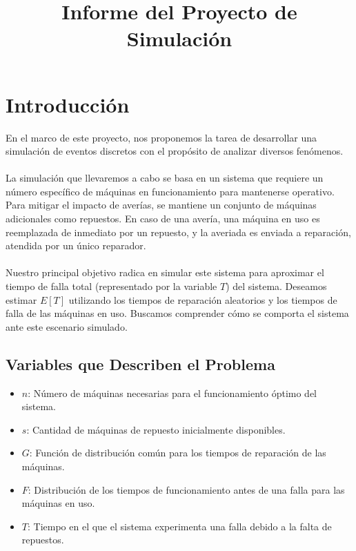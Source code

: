 \documentclass{article}
\begin{document}
\title{Informe del Proyecto de Simulación}
\maketitle


\section{Introducción}

 En el marco de este proyecto, nos proponemos la tarea de desarrollar una simulación de eventos discretos con el propósito de analizar diversos fenómenos.
\\\\
 La simulación que llevaremos a cabo se basa en un sistema que requiere un número específico de máquinas en funcionamiento para mantenerse operativo. Para mitigar el impacto de averías, se mantiene un conjunto de máquinas adicionales como repuestos. En caso de una avería, una máquina en uso es reemplazada de inmediato por un repuesto, y la averiada es enviada a reparación, atendida por un único reparador.
\\\\
 Nuestro principal objetivo radica en simular este sistema para aproximar el tiempo de falla total (representado por la variable \(T\)) del sistema. Deseamos estimar \(E[T]\) utilizando los tiempos de reparación aleatorios y los tiempos de falla de las máquinas en uso. Buscamos comprender cómo se comporta el sistema ante este escenario simulado.

\subsection{Variables que Describen el Problema}
\begin{itemize}
  \item \(\textit{n}\): Número de máquinas necesarias para el funcionamiento óptimo del sistema.
  \item \(\textit{s}\): Cantidad de máquinas de repuesto inicialmente disponibles.
  \item \(\textit{G}\): Función de distribución común para los tiempos de reparación de las máquinas.
  \item \(\textit{F}\): Distribución de los tiempos de funcionamiento antes de una falla para las máquinas en uso.
  \item \(\textit{T}\): Tiempo en el que el sistema experimenta una falla debido a la falta de repuestos.
\end{itemize}
\end{document}
